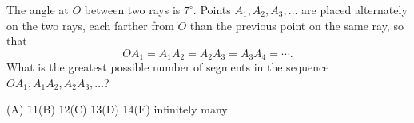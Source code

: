 The angle at $O$ between two rays is $7^\circ$. Points $A_1,A_2,A_3,\dots$ are placed alternately on the two rays, each farther from $O$ than the previous point on the same ray, so that
\[
OA_1=A_1A_2=A_2A_3=A_3A_4=\cdots .
\]
What is the greatest possible number of segments in the sequence $OA_1, A_1A_2, A_2A_3,\dots$?

(A) $11$\quad (B) $12$\quad (C) $13$\quad (D) $14$\quad (E) infinitely many
